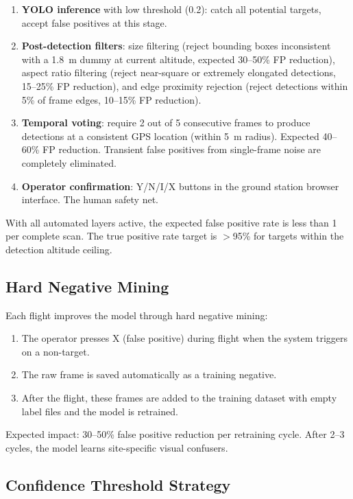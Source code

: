 \begin{enumerate}
    \item \textbf{YOLO inference} with low threshold (0.2): catch all potential
          targets, accept false positives at this stage.
    \item \textbf{Post-detection filters}: size filtering (reject bounding boxes
          inconsistent with a 1.8~m dummy at current altitude, expected 30--50\%
          FP reduction), aspect ratio filtering (reject near-square or extremely
          elongated detections, 15--25\% FP reduction), and edge proximity rejection
          (reject detections within 5\% of frame edges, 10--15\% FP reduction).
    \item \textbf{Temporal voting}: require 2 out of 5 consecutive frames to
          produce detections at a consistent GPS location (within 5~m radius).
          Expected 40--60\% FP reduction. Transient false positives from
          single-frame noise are completely eliminated.
    \item \textbf{Operator confirmation}: Y/N/I/X buttons in the ground station
          browser interface. The human safety net.
\end{enumerate}

With all automated layers active, the expected false positive rate is less than
1 per complete scan. The true positive rate target is $>$95\% for targets within
the detection altitude ceiling.

\subsection{Hard Negative Mining}

Each flight improves the model through hard negative mining:
\begin{enumerate}
    \item The operator presses X (false positive) during flight when the system
          triggers on a non-target.
    \item The raw frame is saved automatically as a training negative.
    \item After the flight, these frames are added to the training dataset with
          empty label files and the model is retrained.
\end{enumerate}

Expected impact: 30--50\% false positive reduction per retraining cycle. After
2--3 cycles, the model learns site-specific visual confusers.

\subsection{Confidence Threshold Strategy}

